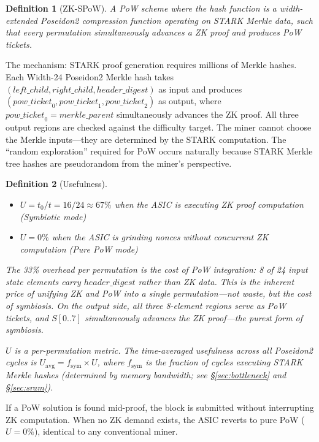 \documentclass[11pt,a4paper]{article}
\newtheorem{definition}{Definition}
\begin{document}
\begin{definition}[ZK-SPoW]
A PoW scheme where the hash function is a width-extended Poseidon2 compression function operating on STARK Merkle data, such that every permutation simultaneously advances a ZK proof and produces PoW tickets.
\end{definition}

The mechanism: STARK proof generation requires millions of Merkle hashes. Each Width-24 Poseidon2 Merkle hash takes $(\mathit{left\_child}, \mathit{right\_child}, \mathit{header\_digest})$ as input and produces $(\mathit{pow\_ticket}_0, \mathit{pow\_ticket}_1, \mathit{pow\_ticket}_2)$ as output, where $\mathit{pow\_ticket}_0 = \mathit{merkle\_parent}$ simultaneously advances the ZK proof. All three output regions are checked against the difficulty target. The miner cannot choose the Merkle inputs---they are determined by the STARK computation. The ``random exploration'' required for PoW occurs naturally because STARK Merkle tree hashes are pseudorandom from the miner's perspective.

\begin{definition}[Usefulness]
\begin{itemize}
\item $U = t_0/t = 16/24 \approx 67\%$ when the ASIC is executing ZK proof computation (Symbiotic mode)
\item $U = 0\%$ when the ASIC is grinding nonces without concurrent ZK computation (Pure PoW mode)
\end{itemize}
The 33\% overhead per permutation is the cost of PoW integration: 8 of 24 input state elements carry $\mathit{header\_digest}$ rather than ZK data. This is the inherent price of unifying ZK and PoW into a single permutation---not waste, but the cost of symbiosis. On the output side, all three 8-element regions serve as PoW tickets, and $S[0..7]$ simultaneously advances the ZK proof---the purest form of symbiosis.

$U$ is a per-permutation metric. The time-averaged usefulness across all Poseidon2 cycles is $U_{\mathrm{avg}} = f_{\mathrm{sym}} \times U$, where $f_{\mathrm{sym}}$ is the fraction of cycles executing STARK Merkle hashes (determined by memory bandwidth; see \S\ref{sec:bottleneck} and \S\ref{sec:sram}).
\end{definition}

If a PoW solution is found mid-proof, the block is submitted without interrupting ZK computation. When no ZK demand exists, the ASIC reverts to pure PoW ($U = 0\%$), identical to any conventional miner.
\end{document}
